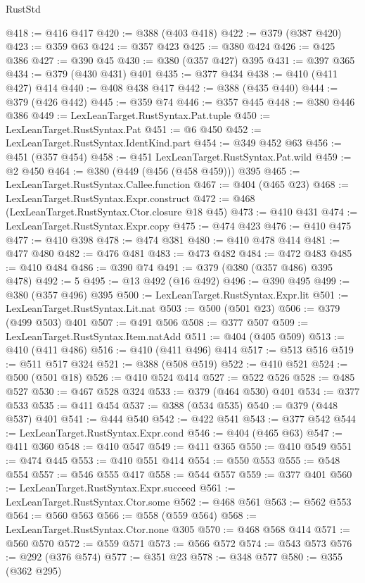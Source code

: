 \begin{lexlean}{RustStd}
\begin{coremodule}
@418 := @416 @417
@420 := @388 (@403 @418)
@422 := @379 (@387 @420)
@423 := @359 @63
@424 := @357 @423
@425 := @380 @424
@426 := @425 @386
@427 := @390 @45
@430 := @380 (@357 @427) @395
@431 := @397 @365
@434 := @379 (@430 @431) @401
@435 := @377 @434
@438 := @410 (@411 @427) @414
@440 := @408 @438 @417
@442 := @388 (@435 @440)
@444 := @379 (@426 @442)
@445 := @359 @74
@446 := @357 @445
@448 := @380 @446 @386
@449 := LexLeanTarget.RustSyntax.Pat.tuple
@450 := LexLeanTarget.RustSyntax.Pat
@451 := @6 @450
@452 := LexLeanTarget.RustSyntax.IdentKind.part
@454 := @349 @452 @63
@456 := @451 (@357 @454)
@458 := @451 LexLeanTarget.RustSyntax.Pat.wild
@459 := @2 @450
@464 := @380 (@449 (@456 (@458 @459))) @395
@465 := LexLeanTarget.RustSyntax.Callee.function
@467 := @404 (@465 @23)
@468 := LexLeanTarget.RustSyntax.Expr.construct
@472 := @468 (LexLeanTarget.RustSyntax.Ctor.closure @18 @45)
@473 := @410 @431
@474 := LexLeanTarget.RustSyntax.Expr.copy
@475 := @474 @423
@476 := @410 @475
@477 := @410 @398
@478 := @474 @381
@480 := @410 @478 @414
@481 := @477 @480
@482 := @476 @481
@483 := @473 @482
@484 := @472 @483
@485 := @410 @484
@486 := @390 @74
@491 := @379 (@380 (@357 @486) @395 @478)
@492 := 5
@495 := @13 @492 (@16 @492)
@496 := @390 @495
@499 := @380 (@357 @496) @395
@500 := LexLeanTarget.RustSyntax.Expr.lit
@501 := LexLeanTarget.RustSyntax.Lit.nat
@503 := @500 (@501 @23)
@506 := @379 (@499 @503) @401
@507 := @491 @506
@508 := @377 @507
@509 := LexLeanTarget.RustSyntax.Item.natAdd
@511 := @404 (@405 @509)
@513 := @410 (@411 @486)
@516 := @410 (@411 @496) @414
@517 := @513 @516
@519 := @511 @517 @324
@521 := @388 (@508 @519)
@522 := @410 @521
@524 := @500 (@501 @18)
@526 := @410 @524 @414
@527 := @522 @526
@528 := @485 @527
@530 := @467 @528 @324
@533 := @379 (@464 @530) @401
@534 := @377 @533
@535 := @411 @454
@537 := @388 (@534 @535)
@540 := @379 (@448 @537) @401
@541 := @444 @540
@542 := @422 @541
@543 := @377 @542
@544 := LexLeanTarget.RustSyntax.Expr.cond
@546 := @404 (@465 @63)
@547 := @411 @360
@548 := @410 @547
@549 := @411 @365
@550 := @410 @549
@551 := @474 @445
@553 := @410 @551 @414
@554 := @550 @553
@555 := @548 @554
@557 := @546 @555 @417
@558 := @544 @557
@559 := @377 @401
@560 := LexLeanTarget.RustSyntax.Expr.succeed
@561 := LexLeanTarget.RustSyntax.Ctor.some
@562 := @468 @561
@563 := @562 @553
@564 := @560 @563
@566 := @558 (@559 @564)
@568 := LexLeanTarget.RustSyntax.Ctor.none @305
@570 := @468 @568 @414
@571 := @560 @570
@572 := @559 @571
@573 := @566 @572
@574 := @543 @573
@576 := @292 (@376 @574)
@577 := @351 @23
@578 := @348 @577
@580 := @355 (@362 @295)

\end{coremodule}
\end{lexlean}
